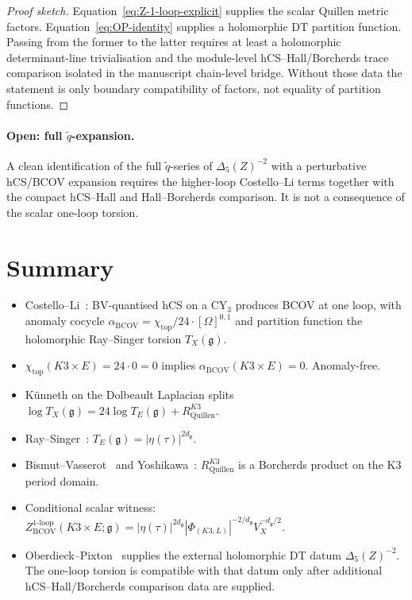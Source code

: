 \documentclass[11pt]{article}
\theoremstyle{definition}
\providecommand{\frakg}{\mathfrak{g}}
\providecommand{\BCOV}{\mathrm{BCOV}}
\providecommand{\oneloop}{\mathrm{loop}}
\begin{document}
\begin{proof}[Proof sketch]
Equation~\eqref{eq:Z-1-loop-explicit} supplies the scalar Quillen
metric factors. Equation~\eqref{eq:OP-identity} supplies a holomorphic
DT partition function. Passing from the former to the latter requires
at least a holomorphic determinant-line trivialisation and the
module-level hCS--Hall/Borcherds trace comparison isolated in the
manuscript chain-level bridge. Without those data the statement is only
boundary compatibility of factors, not equality of partition functions.
\end{proof}

\paragraph{Open: full $\tilde q$-expansion.} A clean identification of
the full $\tilde q$-series of $\Delta_5(Z)^{-2}$ with a perturbative
hCS/BCOV expansion requires the higher-loop Costello--Li terms together
with the compact hCS--Hall and Hall--Borcherds comparison. It is not a
consequence of the scalar one-loop torsion.

\section{Summary}
\label{sec:summary}

\begin{itemize}[leftmargin=*]
\item Costello--Li~\cite{CL1201.4501}: BV-quantised hCS on a CY$_3$
produces BCOV at one loop, with anomaly cocycle
$\alpha_{\BCOV} = \chi_{\mathrm{top}}/24\cdot[\Omega]^{0,1}$
and partition function the holomorphic Ray--Singer torsion
$T_X(\frakg)$.
\item $\chi_{\mathrm{top}}(K3\times E) = 24\cdot 0 = 0$ implies
$\alpha_{\BCOV}(K3\times E) = 0$. Anomaly-free.
\item K\"unneth on the Dolbeault Laplacian splits
$\log T_X(\frakg) = 24\log T_E(\frakg) + R_{\mathrm{Quillen}}^{K3}$.
\item Ray--Singer~\cite{RaySinger1973}: $T_E(\frakg) = |\eta(\tau)|^{2d_\frakg}$.
\item Bismut--Vasserot~\cite{BismutVasserot1989} and
Yoshikawa~\cite{Yoshikawa2004}: $R^{K3}_{\mathrm{Quillen}}$ is a
Borcherds product on the K3 period domain.
\item Conditional scalar witness:
$Z^{1\text{-}\oneloop}_{\BCOV}(K3\times E;\frakg) =
|\eta(\tau)|^{2d_\frakg}|\Phi_{(K3,L)}|^{-2/d_\frakg}V_X^{-d_\frakg/2}$.
\item Oberdieck--Pixton~\cite{OberdieckPixton2018} supplies the
external holomorphic DT datum $\Delta_5(Z)^{-2}$. The one-loop torsion
is compatible with that datum only after additional hCS--Hall/Borcherds
comparison data are supplied.
\end{itemize}
\end{document}
